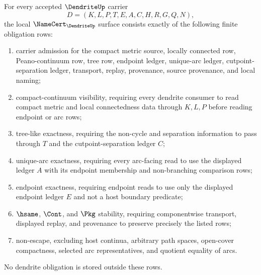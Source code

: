 \begin{theorem}
\label{thm:dendrite-namecert-obligations}
For every accepted $\DendriteUp$ carrier
$$
D=(K,L,P,T,E,A,C,H,R,G,Q,N),
$$
the local $\NameCert_{\DendriteUp}$ surface consists exactly of the following finite obligation rows:
\begin{enumerate}
\item carrier admission for the compact metric source, locally connected row, Peano-continuum row, tree row, endpoint ledger, unique-arc ledger, cutpoint-separation ledger, transport, replay, provenance, source provenance, and local naming;
\item compact-continuum visibility, requiring every dendrite consumer to read compact metric and local connectedness data through $K,L,P$ before reading endpoint or arc rows;
\item tree-like exactness, requiring the non-cycle and separation information to pass through $T$ and the cutpoint-separation ledger $C$;
\item unique-arc exactness, requiring every arc-facing read to use the displayed ledger $A$ with its endpoint membership and non-branching comparison rows;
\item endpoint exactness, requiring endpoint reads to use only the displayed endpoint ledger $E$ and not a host boundary predicate;
\item $\hsame$, $\Cont$, and $\Pkg$ stability, requiring componentwise transport, displayed replay, and provenance to preserve precisely the listed rows;
\item non-escape, excluding host continua, arbitrary path spaces, open-cover compactness, selected arc representatives, and quotient equality of arcs.
\end{enumerate}
No dendrite obligation is stored outside these rows.
\end{theorem}
